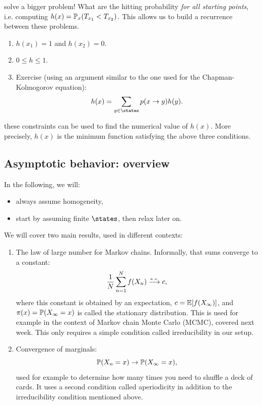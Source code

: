 \documentclass{article}
\begin{document}
 solve a bigger problem! What are the hitting probability \emph{for all starting points}, i.e. computing $h(x) = \P_x(T_{x_1} < T_{x_2})$. This allows us to build a recurrence between these problems.

\begin{enumerate}
  \item $h(x_1) = 1$ and $h(x_2) = 0$.
  \item $0 \le h \le 1$.
  \item Exercise (using an argument similar to the one used for the Chapman-Kolmogorov equation): \[ h(x) = \sum_{y\in\states} p(x\to y) h(y). \]
\end{enumerate}

 these constraints can be used to find the numerical value of $h(x)$. More precisely, $h(x)$ is the minimum function satisfying the above three conditions.


\subsection{Asymptotic behavior: overview}

 In the following, we will:
\begin{itemize}
  \item always assume homogeneity,
  \item start by assuming finite $\states$, then relax later on.
\end{itemize}

We will cover two main results, used in different contexts:
\begin{enumerate}
  \item The law of large number for Markov chains. Informally, that sums converge to a constant: \[ \frac{1}{N} \sum_{n=1}^N f(X_n) \ascv c,\]where this constant is obtained by an expectation, $c = \E[f(X_\infty)]$, and $\pi(x) = \P(X_\infty = x)$ is called the stationary distribution. This is used for example in the context of Markov chain Monte Carlo (MCMC), covered next week. This only requires a simple condition called irreducibility in our setup.
  \item Convergence of marginals: \[ \P(X_n = x) \to \P(X_\infty = x), \]used for example to determine how many times you need to shuffle a deck of cards. It uses a second condition called aperiodicity in addition to the irreducibility condition mentioned above.
\end{enumerate}
\end{document}
